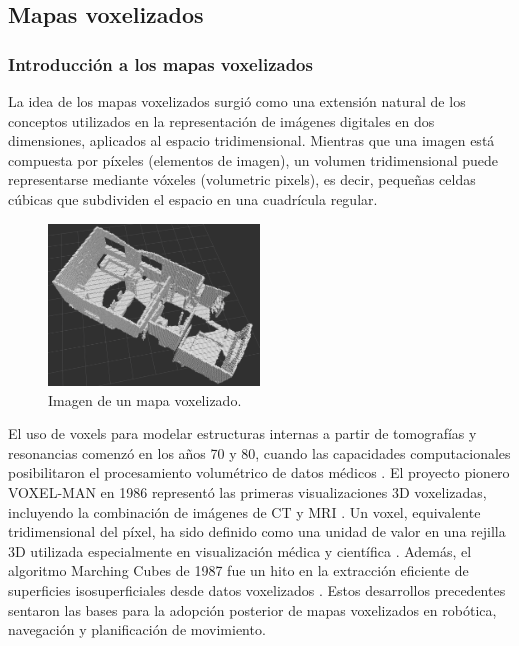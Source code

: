 \documentclass[12pt, a4paper, twoside]{article}
\begin{document}
\subsection{Mapas voxelizados}

\subsubsection{Introducción a los mapas voxelizados}
La idea de los mapas voxelizados surgió como una extensión natural de los conceptos utilizados en la representación 
de imágenes digitales en dos dimensiones, aplicados al espacio tridimensional. Mientras que una imagen está compuesta 
por píxeles (elementos de imagen), un volumen tridimensional puede representarse mediante vóxeles (volumetric pixels), 
es decir, pequeñas celdas cúbicas que subdividen el espacio en una cuadrícula regular. \newline

\begin{figure}[h]
  \centering
    \includegraphics[width=0.5\textwidth]{Voxel_map_example.png}
  \caption{Imagen de un mapa voxelizado.}
\end{figure} 

El uso de voxels para modelar estructuras internas a partir de tomografías y resonancias comenzó en los años 70 y 80, 
cuando las capacidades computacionales posibilitaron el procesamiento volumétrico de datos médicos \cite{wired1996voxels_medical}. 
El proyecto pionero VOXEL-MAN en 1986 representó las primeras visualizaciones 3D voxelizadas, incluyendo la combinación de imágenes 
de CT y MRI \cite{voxelman1986history}. Un voxel, equivalente tridimensional del píxel, ha sido definido como una unidad de valor en 
una rejilla 3D utilizada especialmente en visualización médica y científica \cite{wiki_voxel_definition}. Además, 
el algoritmo Marching Cubes de 1987 fue un hito en la extracción eficiente de superficies isosuperficiales desde datos 
voxelizados \cite{lorensen1987marchingcubes}. Estos desarrollos precedentes sentaron las bases para la adopción posterior 
de mapas voxelizados en robótica, navegación y planificación de movimiento.
\end{document}
